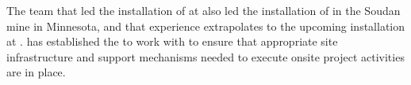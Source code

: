 The team that led the installation of  at
 also led the installation of  in the 
Soudan mine in Minnesota, and that experience extrapolates to 
the upcoming installation at .  has 
established the  to work with  to 
ensure that appropriate site infrastructure and support mechanisms 
needed to execute onsite project activities are in place.
